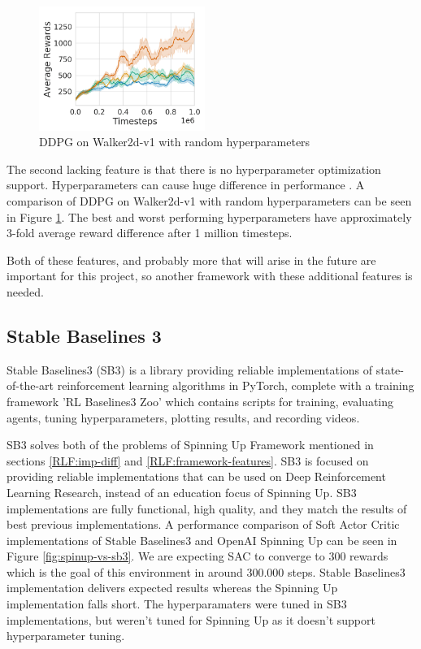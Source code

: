 \begin{figure}
\centering
\includegraphics[width = 0.48\textwidth]{figures/rl-framework/hyperparameter-ddpg.png}
\caption{DDPG on Walker2d-v1 with random hyperparameters \cite{hyperparameter-ddpg}}
\label{fig:hyperparameter-ddpg}
\end{figure}

The second lacking feature is that there is no hyperparameter optimization support. Hyperparameters can cause huge difference in performance \cite{hyperparameter-ddpg}. A comparison of DDPG on Walker2d-v1 with random hyperparameters can be seen in Figure \ref{fig:hyperparameter-ddpg}. The best and worst performing hyperparameters have approximately 3-fold average reward difference after 1 million timesteps.

Both of these features, and probably more that will arise in the future are important for this project, so another framework with these additional features is needed.


\subsection{Stable Baselines 3}
Stable Baselines3 (SB3) is a library providing reliable implementations of state-of-the-art reinforcement learning algorithms in PyTorch, complete with a training framework 'RL Baselines3 Zoo' which contains scripts for training, evaluating agents, tuning hyperparameters, plotting results, and recording videos. \cite{stable-baselines3} 

SB3 solves both of the problems of Spinning Up Framework mentioned in sections \ref{RLF:imp-diff} and \ref{RLF:framework-features}. SB3 is focused on providing reliable implementations that can be used on Deep Reinforcement Learning Research, instead of an education focus of Spinning Up. SB3 implementations are fully functional, high quality, and they match the results of best previous implementations. A performance comparison of Soft Actor Critic implementations of Stable Baselines3 and OpenAI Spinning Up can be seen in Figure \ref{fig:spinup-vs-sb3}. We are expecting SAC to converge to 300 rewards which is the goal of this environment \cite{Bipedal-Walker-v2} in around 300.000 steps. \cite{gym-leaderboard} Stable Baselines3 implementation delivers expected results whereas the Spinning Up implementation falls short. The hyperparamaters were tuned in SB3 implementations, but weren't tuned for Spinning Up as it doesn't support hyperparameter tuning.

